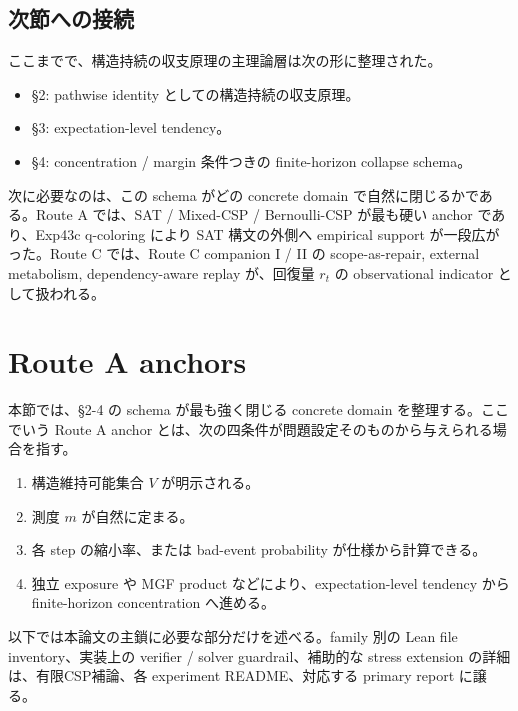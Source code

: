 \documentclass[12pt,a4paper]{article}
\begin{document}
\subsection{次節への接続}\label{ux6b21ux7bc0ux3078ux306eux63a5ux7d9a-1}

ここまでで、構造持続の収支原理の主理論層は次の形に整理された。

\begin{itemize}
\tightlist
\item
  §2: pathwise identity としての構造持続の収支原理。
\item
  §3: expectation-level tendency。
\item
  §4: concentration / margin 条件つきの finite-horizon collapse schema。
\end{itemize}

次に必要なのは、この schema がどの concrete domain で自然に閉じるかである。Route A では、SAT / Mixed-CSP / Bernoulli-CSP が最も硬い anchor であり、Exp43c q-coloring により SAT 構文の外側へ empirical support が一段広がった。Route C では、Route C companion I / II の scope-as-repair, external metabolism, dependency-aware replay が、回復量 \(r_{t}\) の observational indicator として扱われる。

\section{Route A anchors}\label{route-a-anchors}

本節では、§2-4 の schema が最も強く閉じる concrete domain を整理する。ここでいう Route A anchor とは、次の四条件が問題設定そのものから与えられる場合を指す。

\begin{enumerate}
\def\labelenumi{\arabic{enumi}.}
\tightlist
\item
  構造維持可能集合 \(V\) が明示される。
\item
  測度 \(m\) が自然に定まる。
\item
  各 step の縮小率、または bad-event probability が仕様から計算できる。
\item
  独立 exposure や MGF product などにより、expectation-level tendency から finite-horizon concentration へ進める。
\end{enumerate}

以下では本論文の主鎖に必要な部分だけを述べる。family 別の Lean file inventory、実装上の verifier / solver guardrail、補助的な stress extension の詳細は、有限CSP補論、各 experiment README、対応する primary report に譲る。
\end{document}
